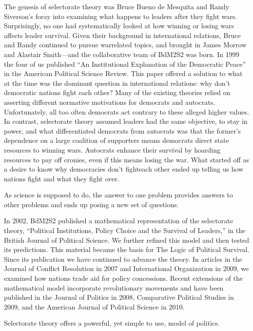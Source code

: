 \documentclass[10pt]{article}
\begin{document}
{\large The genesis of selectorate theory was Bruce Bueno de Mesquita and Randy
Siverson's foray into examining what happens to leaders after they fight wars.
Surprisingly, no one had systematically looked at how winning or losing wars
affects leader survival. Given their background in international relations, Bruce
and Randy continued to pursue warrelated topics, and brought in James Morrow and
Alastair Smith---and the collaborative team of BdM2S2 was born. In 1999 the four
of us published ``An Institutional Explanation of the Democratic Peace'' in the
American Political Science Review. This paper offered a solution to what at the
time was the dominant question in international relations: why don't democratic
nations fight each other? Many of the existing theories relied on asserting
different normative motivations for democrats and autocrats. Unfortunately, all
too often democrats act contrary to these alleged higher values. In contrast,
selectorate theory assumed leaders had the same objective, to stay in power, and
what differentiated democrats from autocrats was that the former's dependence on
a large coalition of supporters means democrats direct state resources to winning
wars. Autocrats enhance their survival by hoarding resources to pay off cronies,
even if this means losing the war. What started off as a desire to know why
democracies don't fighteach other ended up telling us how nations fight and what
they fight over.}

{\large As science is supposed to do, the answer to one problem provides answers
to other problems and ends up posing a new set of questions.}

{\large In 2002, BdM2S2 published a mathematical representation of the
selectorate theory, ``Political Institutions, Policy Choice and the Survival of
Leaders,'' in the British Journal of Political Science. We further refined this
model and then tested its predictions. This material became the basis for The
Logic of Political Survival. Since its publication we have continued to advance
the theory. In articles in the Journal of Conflict Resolution in 2007 and
International Organization in 2009, we examined how nations trade aid for policy
concessions. Recent extensions of the mathematical model incorporate
revolutionary movements and have been published in the Journal of Politics in
2008, Comparative Political Studies in 2009, and the American Journal of
Political Science in 2010.}

{\large Selectorate theory offers a powerful, yet simple to use, model of
politics.}
\end{document}
